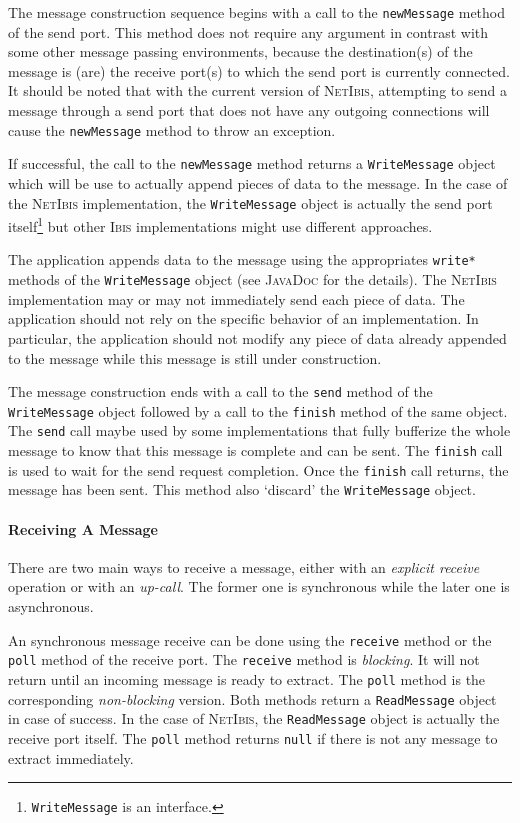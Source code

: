 \documentclass[11pt]{book}
\def\Ibis{\textsc{Ibis}\xspace}
\def\NetIbis{\textsc{NetIbis}\xspace}
\def\jd{\textsc{JavaDoc}\xspace}
\begin{document}
The message construction sequence begins with a call to the
\texttt{newMessage} method of the send port. This method does not require
any argument in contrast with some other message passing environments,
because the destination(s) of the message is (are) the receive port(s)
to which the send port is currently connected. It should be noted that
with the current version of \NetIbis, attempting to send a message
through a send port that does not have any outgoing connections will
cause the \texttt{newMessage} method to throw an exception.

If successful, the call to the \texttt{newMessage} method returns a
\texttt{WriteMessage} object which will be use to actually append
pieces of data to the message. In the case of the \NetIbis
implementation, the \texttt{WriteMessage} object is actually the send
port itself\footnote{\texttt{WriteMessage} is an interface.} but other
\Ibis implementations might use different approaches.

The application appends data to the message using the appropriates
\texttt{write*} methods of the \texttt{WriteMessage} object (see \jd
for the details). The \NetIbis implementation may or may not
immediately send each piece of data. The application should not rely
on the specific behavior of an implementation. In particular, the
application should not modify any piece of data already appended to
the message while this message is still under construction.

The message construction ends with a call to the \texttt{send} method
of the \texttt{WriteMessage} object followed by a call to the
\texttt{finish} method of the same object. The \texttt{send} call
maybe used by some implementations that fully bufferize the whole
message to know that this message is complete and can be sent. The
\texttt{finish} call is used to wait for the send request completion.
Once the \texttt{finish} call returns, the message has been sent.
This method also `discard' the \texttt{WriteMessage} object.

\paragraph{Receiving A Message}
\label{sec:receiving-message}

There are two main ways to receive a message, either with an
\emph{explicit receive} operation or with an \emph{up-call}. The former
one is synchronous while the later one is asynchronous.

An synchronous message receive can be done using the \texttt{receive}
method or the \texttt{poll} method of the receive port. The
\texttt{receive} method is \emph{blocking}. It will not return until
an incoming message is ready to extract. The \texttt{poll} method is
the corresponding \emph{non-blocking} version. Both methods return a
\texttt{ReadMessage} object in case of success. In the case of
\NetIbis, the \texttt{ReadMessage} object is actually the receive port
itself. The \texttt{poll} method returns \texttt{null} if there is not
any message to extract immediately.
\end{document}

